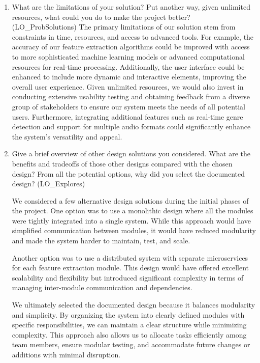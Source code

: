 \documentclass[12pt, titlepage]{article}
\begin{document}
\begin{enumerate}
  \item What are the limitations of your solution?  Put another way, given
  unlimited resources, what could you do to make the project better? (LO\_ProbSolutions)
  The primary limitations of our solution stem from constraints in time, resources, and access to advanced tools. For example, the accuracy of our feature extraction algorithms could be improved with access to more sophisticated machine learning models or advanced computational resources for real-time processing. Additionally, the user interface could be enhanced to include more dynamic and interactive elements, improving the overall user experience. Given unlimited resources, we would also invest in conducting extensive usability testing and obtaining feedback from a diverse group of stakeholders to ensure our system meets the needs of all potential users. Furthermore, integrating additional features such as real-time genre detection and support for multiple audio formats could significantly enhance the system’s versatility and appeal.
  \item Give a brief overview of other design solutions you considered.  What
  are the benefits and tradeoffs of those other designs compared with the chosen
  design?  From all the potential options, why did you select the documented design?
  (LO\_Explores)

  We considered a few alternative design solutions during the initial phases of the project. One option was to use a monolithic design where all the modules were tightly integrated into a single system. While this approach would have simplified communication between modules, it would have reduced modularity and made the system harder to maintain, test, and scale.

Another option was to use a distributed system with separate microservices for each feature extraction module. This design would have offered excellent scalability and flexibility but introduced significant complexity in terms of managing inter-module communication and dependencies.

We ultimately selected the documented design because it balances modularity and simplicity. By organizing the system into clearly defined modules with specific responsibilities, we can maintain a clear structure while minimizing complexity. This approach also allows us to allocate tasks efficiently among team members, ensure modular testing, and accommodate future changes or additions with minimal disruption.
\end{enumerate}
\end{document}

